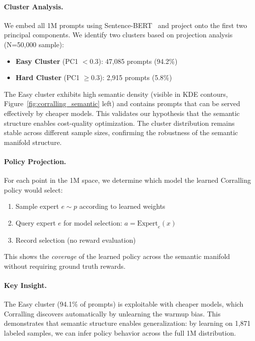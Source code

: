\paragraph{Cluster Analysis.}
We embed all 1M prompts using Sentence-BERT~\cite{reimers2019sentence} and project onto the first two principal components.
We identify two clusters based on projection analysis (N=50,000 sample):
\begin{itemize}[nosep]
    \item \textbf{Easy Cluster} (PC1 $< 0.3$): 47,085 prompts (94.2\%)
    \item \textbf{Hard Cluster} (PC1 $\geq 0.3$): 2,915 prompts (5.8\%)
\end{itemize}

The Easy cluster exhibits high semantic density (visible in KDE contours, Figure~\ref{fig:corralling_semantic} left) and contains prompts that can be served effectively by cheaper models.
This validates our hypothesis that the semantic structure enables cost-quality optimization.
The cluster distribution remains stable across different sample sizes, confirming the robustness of the semantic manifold structure.

\paragraph{Policy Projection.}
For each point in the 1M space, we determine which model the learned Corralling policy would select:
\begin{enumerate}[nosep]
    \item Sample expert $e \sim p$ according to learned weights
    \item Query expert $e$ for model selection: $a = \text{Expert}_e(x)$
    \item Record selection (no reward evaluation)
\end{enumerate}

This shows the \emph{coverage} of the learned policy across the semantic manifold without requiring ground truth rewards.

\paragraph{Key Insight.}
The Easy cluster (94.1\% of prompts) is exploitable with cheaper models, which Corralling discovers automatically by unlearning the warmup bias.
This demonstrates that semantic structure enables generalization: by learning on 1,871 labeled samples, we can infer policy behavior across the full 1M distribution.


